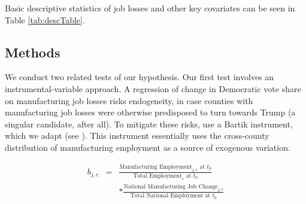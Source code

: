 \documentclass[]{AEA}
\begin{document}
Basic descriptive statistics of job losses and other key covariates can
be seen in Table \ref{tab:descTable}. \FloatBarrier

\begin{table}[!h]

\caption{\label{tab:descTable}Manufacturing Job Changes 2004-2015}
\centering
{}
\end{table}
\FloatBarrier

\subsection{Methods} 
\label{methodssec}

We conduct two related tests of our hypothesis. Our first test involves
an instrumental-variable approach. A regression of change in Democratic
vote share on manufacturing job losses risks endogeneity, in case
counties with manufacturing job losses were otherwise predisposed to
turn towards Trump (a singular candidate, after all). To mitigate these
risks, \cite{Baccini21} use a Bartik instrument, which we adapt (see
\cite{Bartik91}). This instrument essentially uses the cross-county
distribution of manufacturing employment as a source of exogenous
variation.

\[
\begin{aligned}
b_{j,c} &=& \frac{\text{Manufacturing Employment}_{j,c} \text{ at } t_0}{\text{Total Employment}_c \text{ at }t_0}  \\
&&  * \frac{\text{National Manufacturing Job Change}_{j,c} }{\text{Total National Employment at }t_0} \\
\end{aligned}
\]
\end{document}
